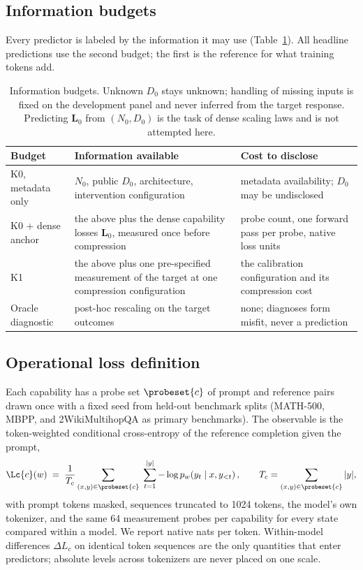 \subsection{Information budgets}
\label{sec:budgets}

Every predictor is labeled by the information it may use
(Table~\ref{tab:budgets}). All headline predictions use the second
budget; the first is the reference for what training tokens add.

\begin{table}[t]
\centering\small
\begin{tabular}{@{}p{2.5cm}p{5.7cm}p{4.9cm}@{}}
\toprule
Budget & Information available & Cost to disclose \\
\midrule
K0, metadata only & $N_0$, public $D_0$, architecture, intervention
configuration & metadata availability; $D_0$ may be undisclosed \\
K0 + dense anchor & the above plus the dense capability losses
$\mathbf L_0$, measured once before compression & probe count, one
forward pass per probe, native loss units \\
K1 & the above plus one pre-specified measurement of the target at one
compression configuration & the calibration configuration and its
compression cost \\
Oracle diagnostic & post-hoc rescaling on the target outcomes & none;
diagnoses form misfit, never a prediction \\
\bottomrule
\end{tabular}
\caption{Information budgets. Unknown $D_0$ stays unknown; handling of
missing inputs is fixed on the development panel and never inferred
from the target response. Predicting $\mathbf L_0$ from $(N_0,D_0)$ is
the task of dense scaling laws and is not attempted here.}
\label{tab:budgets}
\end{table}

\subsection{Operational loss definition}
\label{sec:loss}

Each capability has a probe set $\probeset{c}$ of prompt and reference
pairs drawn once with a fixed seed from held-out benchmark splits
(MATH-500, MBPP, and 2WikiMultihopQA as primary benchmarks). The
observable is the token-weighted conditional cross-entropy of the
reference completion given the prompt,
\begin{equation}
\Lc{c}(w)\;=\;\frac{1}{T_c}\sum_{(x,y)\in\probeset{c}}\;\sum_{t=1}^{|y|}
-\log p_w\!\left(y_t\mid x,y_{<t}\right),
\qquad T_c=\sum_{(x,y)\in\probeset{c}}|y|,
\label{eq:taskloss}
\end{equation}
with prompt tokens masked, sequences truncated to 1024 tokens, the
model's own tokenizer, and the same 64 measurement probes per
capability for every state compared within a model. We report native
nats per token. Within-model differences $\Delta L_c$ on identical
token sequences are the only quantities that enter predictors; absolute
levels across tokenizers are never placed on one scale.

